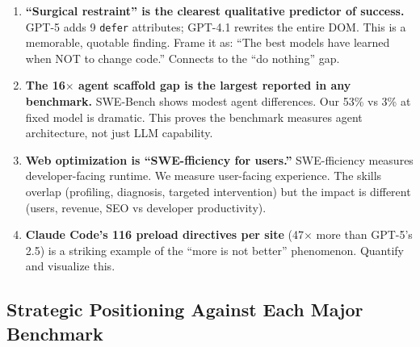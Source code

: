 \begin{enumerate}
    \item \textbf{``Surgical restraint'' is the clearest qualitative predictor of success.} GPT-5 adds 9 \texttt{defer} attributes; GPT-4.1 rewrites the entire DOM. This is a memorable, quotable finding. Frame it as: ``The best models have learned when NOT to change code.'' Connects to the ``do nothing'' gap.

    \item \textbf{The 16$\times$ agent scaffold gap is the largest reported in any benchmark.} SWE-Bench shows modest agent differences. Our 53\% vs 3\% at fixed model is dramatic. This proves the benchmark measures agent architecture, not just LLM capability.

    \item \textbf{Web optimization is ``SWE-fficiency for users.''} SWE-fficiency measures developer-facing runtime. We measure user-facing experience. The skills overlap (profiling, diagnosis, targeted intervention) but the impact is different (users, revenue, SEO vs developer productivity).

    \item \textbf{Claude Code's 116 preload directives per site} (47$\times$ more than GPT-5's 2.5) is a striking example of the ``more is not better'' phenomenon. Quantify and visualize this.
\end{enumerate}

\subsection{Strategic Positioning Against Each Major Benchmark}

